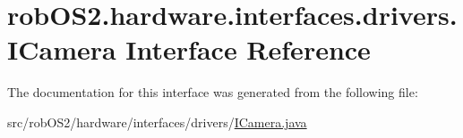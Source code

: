 \hypertarget{interfacerob_o_s2_1_1hardware_1_1interfaces_1_1drivers_1_1_i_camera}{
\section{robOS2.hardware.interfaces.drivers.ICamera Interface Reference}
\label{interfacerob_o_s2_1_1hardware_1_1interfaces_1_1drivers_1_1_i_camera}
}


The documentation for this interface was generated from the following file:\begin{DoxyCompactItemize}
\item 
src/robOS2/hardware/interfaces/drivers/\hyperlink{_i_camera_8java}{ICamera.java}\end{DoxyCompactItemize}
